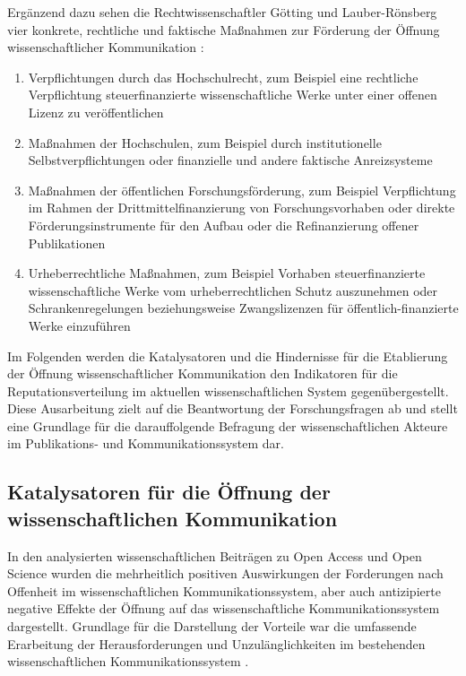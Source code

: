 Ergänzend dazu sehen die Rechtwissenschaftler Götting und Lauber-Rönsberg vier konkrete, rechtliche und faktische Maßnahmen zur Förderung der Öffnung wissenschaftlicher Kommunikation \cite[:138]{Goetting_2015}:
\begin{enumerate}
\item Verpflichtungen durch das Hochschulrecht, zum Beispiel eine rechtliche Verpflichtung steuerfinanzierte wissenschaftliche Werke unter einer offenen Lizenz zu veröffentlichen
\item Maßnahmen der Hochschulen, zum Beispiel durch institutionelle Selbstverpflichtungen oder finanzielle und andere faktische Anreizsysteme
\item Maßnahmen der öffentlichen Forschungsförderung, zum Beispiel Verpflichtung im Rahmen der Drittmittelfinanzierung von Forschungsvorhaben oder direkte Förderungsinstrumente für den Aufbau oder die Refinanzierung offener Publikationen
\item Urheberrechtliche Maßnahmen, zum Beispiel Vorhaben steuerfinanzierte wissenschaftliche Werke vom urheberrechtlichen Schutz auszunehmen oder Schrankenregelungen beziehungsweise Zwangslizenzen für öffentlich-finanzierte Werke einzuführen
\end{enumerate}

Im Folgenden werden die Katalysatoren und die Hindernisse für die Etablierung der Öffnung wissenschaftlicher Kommunikation den Indikatoren für die Reputationsverteilung im aktuellen wissenschaftlichen System gegenübergestellt. Diese Ausarbeitung zielt auf die Beantwortung der Forschungsfragen ab und stellt eine Grundlage für die darauffolgende Befragung der wissenschaftlichen Akteure im Publikations- und Kommunikationssystem dar.

\subsection{Katalysatoren für die Öffnung der wissenschaftlichen Kommunikation}

In den analysierten wissenschaftlichen Beiträgen zu Open Access und Open Science wurden die mehrheitlich positiven Auswirkungen der Forderungen nach Offenheit im wissenschaftlichen Kommunikationssystem, aber auch antizipierte negative Effekte der Öffnung auf das wissenschaftliche Kommunikationssystem dargestellt. Grundlage für die Darstellung der Vorteile war die umfassende Erarbeitung der Herausforderungen und Unzulänglichkeiten im bestehenden wissenschaftlichen Kommunikationssystem \cite{Herb_2012a}.

